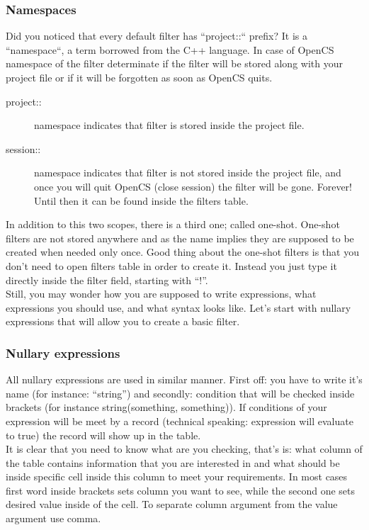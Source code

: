\subsubsection{Namespaces}
Did you noticed that every default filter has ``project::`` prefix? It is a ``namespace``, a term borrowed from the C++ language. In case of OpenCS namespace of the filter determinate if the filter will be stored along with your project file or if it will be forgotten as soon as OpenCS quits.
\begin{description}
 \item[project::] namespace indicates that filter is stored inside the project file.
 \item[session::] namespace indicates that filter is not stored inside the project file, and once you will quit OpenCS (close session) the filter will be gone. Forever! Until then it can be found inside the filters table.
\end{description}
In addition to this two scopes, there is a third one; called one-shot. One-shot filters are not stored anywhere and as the name implies they are supposed to be created when needed only once. Good thing about the one-shot filters is that you don't need to open filters table in order to create it. Instead you just type it directly inside the filter field, starting with ``!''.\\
Still, you may wonder how you are supposed to write expressions, what expressions you should use, and what syntax looks like. Let's start with nullary expressions that will allow you to create a basic filter.

\subsubsection{Nullary expressions}
All nullary expressions are used in similar manner. First off: you have to write it's name (for instance: ``string'') and secondly: condition that will be checked inside brackets (for instance string(something, something)). If conditions of your expression will be meet by a record (technical speaking: expression will evaluate to true) the record will show up in the table.\\
It is clear that you need to know what are you checking, that's is: what column of the table contains information that you are interested in and what should be inside specific cell inside this column to meet your requirements. In most cases first word inside brackets sets column you want to see, while the second one sets desired value inside of the cell. To separate column argument from the value argument use comma.  

